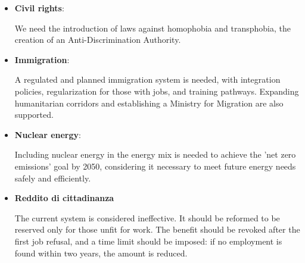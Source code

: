\label{M5S_opinions}

\begin{itemize}
    \item \textbf{Civil rights}:
        \begin{tcolorbox}[prompt]
            [SUPPORTIVE] We need the introduction of laws against homophobia and transphobia, the creation of an Anti-Discrimination Authority.
        \end{tcolorbox}

    \item \textbf{Immigration}:
        \begin{tcolorbox}[prompt]
            [SUPPORTIVE] A regulated and planned immigration system is needed, with integration policies, regularization for those with jobs, and training pathways. Expanding humanitarian corridors and establishing a Ministry for Migration are also supported.
        \end{tcolorbox}
        
    \item \textbf{Nuclear energy}: 
        \begin{tcolorbox}[prompt]
            [SUPPORTIVE] Including nuclear energy in the energy mix is needed to achieve the 'net zero emissions' goal by 2050, considering it necessary to meet future energy needs safely and efficiently.
        \end{tcolorbox}
    
    \item \textbf{Reddito di cittadinanza}
        \begin{tcolorbox}[prompt]
            [OPPOSED] The current system is considered ineffective. It should be reformed to be reserved only for those unfit for work. The benefit should be revoked after the first job refusal, and a time limit should be imposed: if no employment is found within two years, the amount is reduced.
        \end{tcolorbox}
\end{itemize}